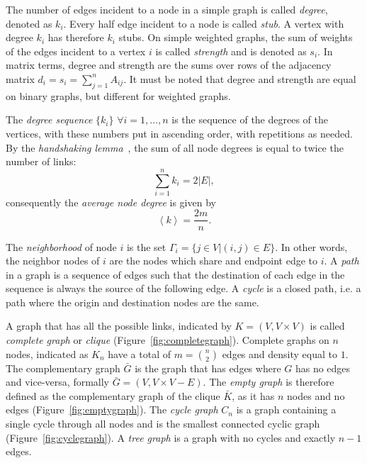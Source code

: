 The number of edges incident to a node in a simple graph is called \emph{degree}, denoted as $k_i$. Every half edge incident to a node is called \emph{stub}. A vertex with degree $k_i$ has therefore $k_i$ stubs.
On simple weighted graphs, the sum of weights of the edges incident to a vertex $i$ is called \emph{strength} and is denoted as $s_i$. 
In matrix terms, degree and strength are the sums over rows of the adjacency matrix $d_i=s_i=\sum_{j=1}^n A_{ij}$. It must be noted that degree and strength are equal on binary graphs, but different for weighted graphs.

The \emph{degree sequence} $\{k_i\}$ $\forall i=1,\ldots,n$ is the sequence  of the degrees of the vertices, with these numbers put in ascending order, with
repetitions as needed. By the \emph{handshaking lemma}~\cite{leiserson2001}, the sum of all node degrees is equal to twice the number of links:
\begin{equation}
\label{eq:handshaking_lemma}
\sum_{i=1}^n k_i=2 |E|,
\end{equation}
consequently the \emph{average node degree} is given by
\begin{equation}
\left< k \right> = \frac{2m}{n}.
\end{equation}

The \emph{neighborhood} of node $i$ is the set $\Gamma_i=\{j \in V | (i,j) \in E \}$. In other words, the neighbor nodes of $i$ are the nodes which share and endpoint edge to $i$. 
A \emph{path} in a graph is a sequence of edges such that the destination of each edge in the sequence is always the source of the following edge. A \emph{cycle} is a closed path, i.e. a path where the origin and destination nodes are the same.

A graph that has all the possible links, indicated by $K=(V,V\times V)$ is called \emph{complete graph} or \emph{clique} (Figure~\ref{fig:completegraph}). Complete graphs on $n$ nodes, indicated as $K_n$ have a total of $m=\binom{n}{2}$ edges and density equal to $1$.
The complementary graph $\bar{G}$ is the graph that has edges where $G$ has no edges and vice-versa, formally $\bar{G}=(V,V\times V - E)$.
The \emph{empty graph} is therefore defined as the complementary graph of the clique $\bar{K}$, as it has $n$ nodes and no edges (Figure~\ref{fig:emptygraph}). The \emph{cycle graph} $C_n$ is a graph containing a single cycle through all nodes and is the smallest connected cyclic graph (Figure~\ref{fig:cyclegraph}). A \emph{tree graph} is a graph with no cycles and exactly $n-1$ edges.

